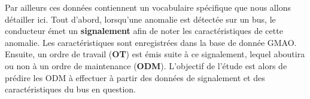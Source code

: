 Par ailleurs ces données contiennent un vocabulaire spécifique que nous allons détailler ici. Tout d’abord, lorsqu'une anomalie est détectée sur un bus, le conducteur émet un \textbf{signalement} afin de noter les caractéristiques de cette anomalie. Les caractéristiques sont enregistrées dans la base de donnée GMAO. Ensuite, un ordre de travail (\textbf{OT}) est émis suite à ce signalement, lequel aboutira ou non à un ordre de maintenance (\textbf{ODM}). L’objectif de l’étude est alors de prédire les ODM à effectuer à partir des données de signalement et des caractéristiques du bus en question.